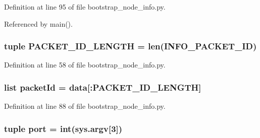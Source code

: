 Definition at line 95 of file bootstrap\+\_\+node\+\_\+info.\+py.



Referenced by main().

\hypertarget{namespacebootstrap__node__info_a83d59726f57beca9201bbb3a5a180ac4}{
\subsubsection[{P\+A\+C\+K\+E\+T\+\_\+\+I\+D\+\_\+\+L\+E\+N\+G\+T\+H}]{\setlength{\rightskip}{0pt plus 5cm}tuple P\+A\+C\+K\+E\+T\+\_\+\+I\+D\+\_\+\+L\+E\+N\+G\+T\+H = len({\bf I\+N\+F\+O\+\_\+\+P\+A\+C\+K\+E\+T\+\_\+\+I\+D})}}\label{namespacebootstrap__node__info_a83d59726f57beca9201bbb3a5a180ac4}


Definition at line 58 of file bootstrap\+\_\+node\+\_\+info.\+py.

\hypertarget{namespacebootstrap__node__info_a115b42342f1f59c59552e68cfb040813}{
\subsubsection[{packet\+Id}]{\setlength{\rightskip}{0pt plus 5cm}list packet\+Id = data\mbox{[}\+:{\bf P\+A\+C\+K\+E\+T\+\_\+\+I\+D\+\_\+\+L\+E\+N\+G\+T\+H}\mbox{]}}}\label{namespacebootstrap__node__info_a115b42342f1f59c59552e68cfb040813}


Definition at line 88 of file bootstrap\+\_\+node\+\_\+info.\+py.

\hypertarget{namespacebootstrap__node__info_a1aadf525515ecfcf662c2aa51a503763}{
\subsubsection[{port}]{\setlength{\rightskip}{0pt plus 5cm}tuple port = int(sys.\+argv\mbox{[}3\mbox{]})}}\label{namespacebootstrap__node__info_a1aadf525515ecfcf662c2aa51a503763}


